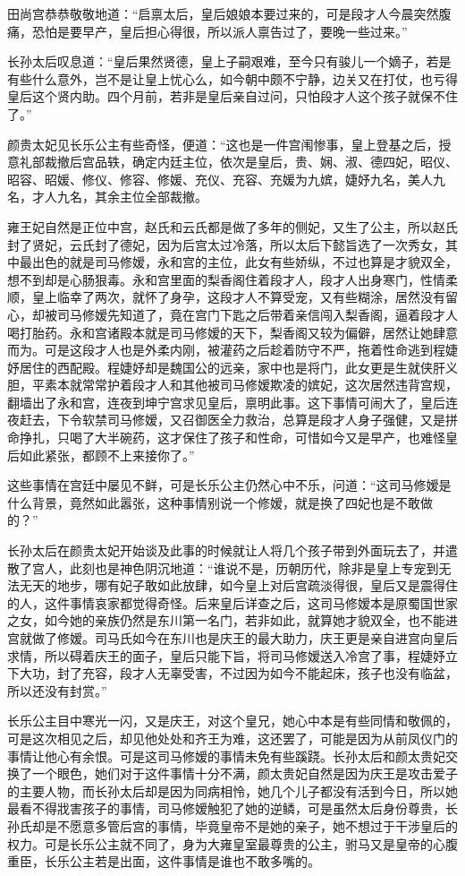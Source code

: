 田尚宫恭恭敬敬地道：“启禀太后，皇后娘娘本要过来的，可是段才人今晨突然腹痛，恐怕是要早产，皇后担心得很，所以派人禀告过了，要晚一些过来。”

长孙太后叹息道：“皇后果然贤德，皇上子嗣艰难，至今只有骏儿一个嫡子，若是有些什么意外，岂不是让皇上忧心么，如今朝中颇不宁静，边关又在打仗，也亏得皇后这个贤内助。四个月前，若非是皇后亲自过问，只怕段才人这个孩子就保不住了。”

颜贵太妃见长乐公主有些奇怪，便道：“这也是一件宫闱惨事，皇上登基之后，授意礼部裁撤后宫品轶，确定内廷主位，依次是皇后，贵、娴、淑、德四妃，昭仪、昭容、昭媛、修仪、修容、修媛、充仪、充容、充媛为九嫔，婕妤九名，美人九名，才人九名，其余主位全部裁撤。

雍王妃自然是正位中宫，赵氏和云氏都是做了多年的侧妃，又生了公主，所以赵氏封了贤妃，云氏封了德妃，因为后宫太过冷落，所以太后下懿旨选了一次秀女，其中最出色的就是司马修嫒，永和宫的主位，此女有些娇纵，不过也算是才貌双全，想不到却是心肠狠毒。永和宫里面的梨香阁住着段才人，段才人出身寒门，性情柔顺，皇上临幸了两次，就怀了身孕，这段才人不算受宠，又有些糊涂，居然没有留心，却被司马修嫒先知道了，竟在宫门下匙之后带着亲信闯入梨香阁，逼着段才人喝打胎药。永和宫诸殿本就是司马修嫒的天下，梨香阁又较为偏僻，居然让她肆意而为。可是这段才人也是外柔内刚，被灌药之后趁着防守不严，拖着性命逃到程婕妤居住的西配殿。程婕妤却是魏国公的远亲，家中也是将门，此女更是生就侠肝义胆，平素本就常常护着段才人和其他被司马修嫒欺凌的嫔妃，这次居然违背宫规，翻墙出了永和宫，连夜到坤宁宫求见皇后，禀明此事。这下事情可闹大了，皇后连夜赶去，下令软禁司马修嫒，又召御医全力救治，总算是段才人身子强健，又是拼命挣扎，只喝了大半碗药，这才保住了孩子和性命，可惜如今又是早产，也难怪皇后如此紧张，都顾不上来接你了。”

这些事情在宫廷中屡见不鲜，可是长乐公主仍然心中不乐，问道：“这司马修嫒是什么背景，竟然如此嚣张，这种事情别说一个修嫒，就是换了四妃也是不敢做的？”

长孙太后在颜贵太妃开始谈及此事的时候就让人将几个孩子带到外面玩去了，并遣散了宫人，此刻也是神色阴沉地道：“谁说不是，历朝历代，除非是皇上专宠到无法无天的地步，哪有妃子敢如此放肆，如今皇上对后宫疏淡得很，皇后又是震得住的人，这件事情哀家都觉得奇怪。后来皇后详查之后，这司马修嫒本是原蜀国世家之女，如今她的亲族仍然是东川第一名门，若非如此，就算她才貌双全，也不能进宫就做了修嫒。司马氏如今在东川也是庆王的最大助力，庆王更是亲自进宫向皇后求情，所以碍着庆王的面子，皇后只能下旨，将司马修嫒送入冷宫了事，程婕妤立下大功，封了充容，段才人无辜受害，不过因为如今不能起床，孩子也没有临盆，所以还没有封赏。”

长乐公主目中寒光一闪，又是庆王，对这个皇兄，她心中本是有些同情和敬佩的，可是这次相见之后，却见他处处和齐王为难，这还罢了，可能是因为从前凤仪门的事情让他心有余恨。可是这司马修嫒的事情未免有些蹊跷。长孙太后和颜太贵妃交换了一个眼色，她们对于这件事情十分不满，颜太贵妃自然是因为庆王是攻击爱子的主要人物，而长孙太后却是因为同病相怜，她几个儿子都没有活到今日，所以她最看不得戕害孩子的事情，司马修嫒触犯了她的逆鳞，可是虽然太后身份尊贵，长孙氏却是不愿意多管后宫的事情，毕竟皇帝不是她的亲子，她不想过于干涉皇后的权力。可是长乐公主就不同了，身为大雍皇室最尊贵的公主，驸马又是皇帝的心腹重臣，长乐公主若是出面，这件事情是谁也不敢多嘴的。

